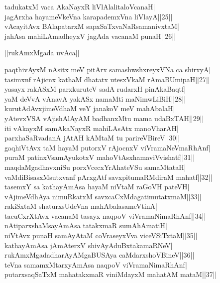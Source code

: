 \documentclass{article}
\begin{document}
tadukatxM vaca AkaNayxR liVlAlalitaloVcanaH|\\
jagArxha hayameVkeVna karapademxVna liVlayA||25||\\
vAcayitAvx BAlapatarxM sapxSaTxvaNaRsamanivxtaM|\\
ja{hA}sa mahiLAmadheyxV jagAda vacanaM punaH||26||\\

\begin{center}
||rukAmxMgada uvAca||
\end{center}

paqthivAyxM nAsitx meV pitArx samashwshxreyxVNa ca shirxyA|\\
tasimxnf rAjicnx kathaM dhatatx utesxVkaM rAmaBUmipaH||27||\\
yasayx rakASxM parxkuruteV sadA rudarxH pinAkaBaqtf|\\
yaM deVvA vAnavA yakASx namaMti maNimwLiBiH||28||\\
kurutAdAvxjimeVdhaM veY janakoV meV mahAbalaH|\\
yAtevxVSA vAjishAlAyAM badhanxMtu mama udaBxTAH||29||\\
iti vAkayxM samAkaNayxR mahiLAsAtx manoVharAH|\\
parxhaSaRvadanA jAtAH kAMtaM tu parireVBireV||30||\\
gaqhiVtAvx taM hayaM putorxV rAjocnxV viVramaNeVmaRhAnf|\\
puraM patinxVsamAyukotxV mahoVtAsxhamaviVvishatf||31||\\
maqdaMgadhavxniSu porxVcecxYrAhateVSu samaMtataH|\\
vaMdiBisasxMsutxvanf pArxgAtf savxpitumaRMdiraM mahatf||32||\\
tasemxY sa kathayAmAsa hayaM niVtaM raGoVH pateVH|\\
vAjimeVdhAya nimuRkatxM savxcaCxMdagatimutatxmaM||33||\\
rakiSxtaM shaturxsUdeVna mahAbalasameVtinA|\\
tacuCxrXtAvx vacanaM tasayx naqpoV viVramaNimaRhAnf||34||\\
nAtiparxshaMsayAmAsa tatakxmaR sumAhAmatiH|\\
niVtAvx punaH samAyAtaM coVraseyxVva viceVSiTxtaM||35||\\
kathayAmAsa jAmAterxV shivAyAduBxtakamaRNeV|\\
rukAmxMgadadharAyAMgaBUSAya caMdarxshoVBineV||36||\\
teVna samamxMtarxyAmAsa naqpoV viVramaNimaRhAnf|\\
putarxsaqSaTxM mahatakxmaR viniMdayxM mahatAM mataM||37||\\
\end{document}
